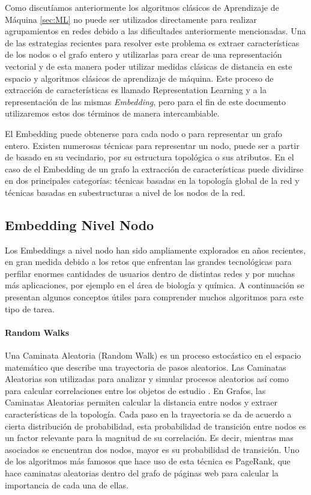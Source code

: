 Como discutíamos anteriormente los algoritmos clásicos de Aprendizaje de Máquina \ref{sec:ML} no puede ser utilizados directamente para realizar agrupamientos en redes debido a las dificultades anteriormente mencionadas. Una de las estrategias recientes para resolver este problema es extraer características de los nodos o el grafo entero y utilizarlas para crear de una representación vectorial y de esta manera poder utilizar medidas clásicas de distancia en este espacio y algoritmos clásicos de aprendizaje de máquina. Este proceso de extracción de características es llamado Representation Learning y a la representación de las mismas \textit{Embedding}, pero para el fin de este documento utilizaremos estos dos términos de manera intercambiable.

El Embedding puede obtenerse para cada nodo o para representar un grafo entero. Existen numerosas técnicas para representar un nodo, puede ser a partir de basado en su vecindario, por su estructura topológica o sus atributos. En el caso de el Embedding de un grafo la extracción de características puede dividirse en dos principales categorías: técnicas basadas en la topología global de la red y técnicas basadas en subestructuras a nivel de los nodos de la red.

\subsection{Embedding Nivel Nodo}

Los Embeddings a nivel nodo han sido ampliamente explorados en años recientes, en gran medida debido a los retos que enfrentan las grandes tecnológicas para perfilar enormes cantidades de usuarios dentro de distintas redes  \cite{lerer_pytorch-biggraph_2019} y por muchas más aplicaciones, por ejemplo en el área de biología y química.
A continuación se presentan algunos conceptos útiles para comprender muchos algoritmos para este tipo de tarea.

\paragraph{Random Walks}
Una Caminata Aleatoria (Random Walk) es un proceso estocástico en el espacio matemático que describe una trayectoria de pasos aleatorios. Las Caminatas Aleatorias son utilizadas para analizar y simular procesos aleatorios así como para calcular correlaciones entre los objetos de estudio \cite{xia_random_2019}. En Grafos, las Caminatas Aleatorias permiten calcular la distancia entre nodos y extraer características de la topología. Cada paso en la trayectoria se da de acuerdo a cierta distribución de probabilidad, esta probabilidad de transición entre nodos es un factor relevante para la magnitud de su correlación. Es decir, mientras mas asociados se encuentran dos nodos, mayor es su probabilidad de transición. Uno de los algoritmos más famosos que hace uso de esta técnica es PageRank, que hace caminatas aleatorias dentro del grafo de páginas web para calcular la importancia de cada una de ellas.

